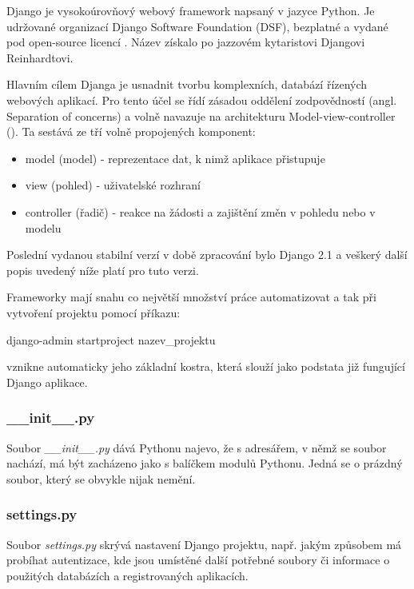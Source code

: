 
Django je vysokoúrovňový webový framework napsaný v jazyce Python. Je
udržované organizací Django Software Foundation (DSF), bezplatné a
vydané pod open-source licencí . Název získalo po jazzovém
kytaristovi Djangovi Reinhardtovi.

Hlavním cílem Djanga je usnadnit tvorbu komplexních, databází řízených
webových aplikací. Pro tento účel se řídí zásadou oddělení
zodpovědností (angl. Separation of concerns) a volně navazuje na
architekturu Model-view-controller (). Ta sestává ze tří volně
propojených komponent:
\begin{itemize}
\item model (model) - reprezentace dat, k nimž aplikace přistupuje
\item view (pohled) - uživatelské rozhraní
\item controller (řadič) - reakce na žádosti a zajištění změn v pohledu nebo v modelu
\end{itemize}

Poslední vydanou stabilní verzí v době zpracování bylo Django 2.1 a
veškerý další popis uvedený níže platí pro tuto verzi.

Frameworky mají snahu co největší množství práce automatizovat a tak
při vytvoření projektu pomocí příkazu:

\begin{center}
\textsf{django-admin startproject nazev\_projektu}
\end{center}

vznikne automaticky jeho základní kostra, která slouží jako podstata
již fungující Django aplikace.


\subsubsection{\_\_init\_\_.py}
Soubor \textit{\_\_init\_\_.py} dává Pythonu najevo, že s adresářem, v
němž se soubor nachází, má být zacházeno jako s balíčkem modulů
Pythonu. Jedná se o prázdný soubor, který se obvykle nijak nemění.

\subsubsection{settings.py}
\label{settings}
Soubor \textit{settings.py} skrývá nastavení Django projektu,
např. jakým způsobem má probíhat autentizace, kde jsou umístěné další
potřebné soubory či informace o použitých databázích a registrovaných
aplikacích.

